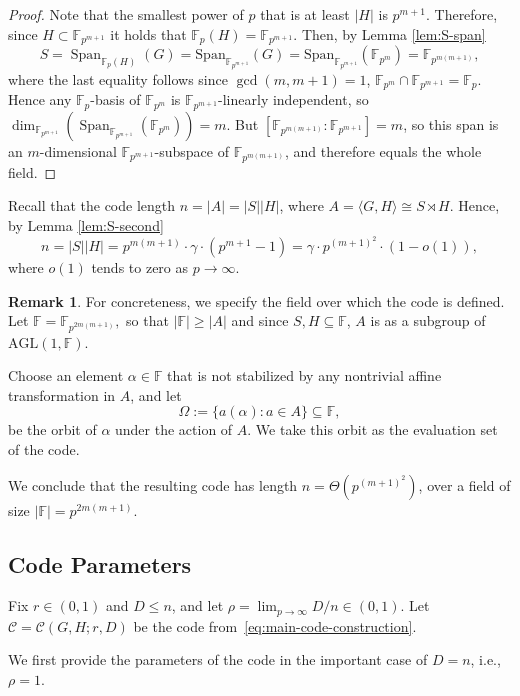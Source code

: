 \documentclass[11pt]{article}
\theoremstyle{plain}
\theoremstyle{definition}
\newtheorem{remark}[theorem]{Remark}
\newcommand{\abs}[1]{\left|#1\right|}
\DeclareMathOperator{\Span}{Span}
\begin{document}
\begin{proof}
Note that the smallest power of $p$ that is at least $\abs{H}$ is $p^{m+1}$. Therefore,  since $H\subset \mathbb{F}_{p^{m+1}}$ it holds that $\mathbb{F}_p(H)=\mathbb{F}_{p^{m+1}}.$
Then, by Lemma \ref{lem:S-span} 
\[
S=\Span_{\mathbb{F}_p(H)}(G)
=\mathrm{Span}_{\mathbb F_{p^{m+1}}}(G)=
\mathrm{Span}_{\mathbb F_{p^{m+1}}}(\mathbb{F}_{p^m})=\mathbb{F}_{p^{m(m+1)}},\]
where the last equality follows since $\gcd(m,m+1)=1$, $\mathbb{F}_{p^m}\cap \mathbb{F}_{p^{m+1}}=\mathbb{F}_p$.
Hence any $\mathbb{F}_p$-basis of $\mathbb{F}_{p^m}$ is $\mathbb{F}_{p^{m+1}}$-linearly independent, so
$\dim_{\mathbb{F}_{p^{m+1}}}\left(\Span_{\mathbb{F}_{p^{m+1}}}(\mathbb{F}_{p^m})\right)=m$.
But $[\mathbb{F}_{p^{m(m+1)}}:\mathbb{F}_{p^{m+1}}]=m$, so this span is an
$m$-dimensional $\mathbb{F}_{p^{m+1}}$-subspace of $\mathbb{F}_{p^{m(m+1)}}$, and therefore equals the whole field.
\end{proof}
Recall that the code length $n=|A|=|S||H|$, where 
$
A=\langle G,H\rangle \cong S\rtimes H.
$
Hence, by Lemma \ref{lem:S-second}
\[
n=|S||H| = p^{m(m+1)}\cdot \gamma\cdot (p^{m+1}-1)= \gamma\cdot p^{(m+1)^2}\cdot (1-o(1)),
\]
where $o(1)$ tends to zero as $p\to\infty$.
\begin{remark}
For concreteness, we specify the  field over which the code is defined. Let
$
\mathbb{F} = \mathbb{F}_{p^{2m(m+1)}},
$
so that $|\mathbb{F}| \ge |A|$ and since $S,H\subseteq \mathbb{F}$, $A$ is as a subgroup of $\mathrm{AGL}(1,\mathbb{F})$. 
\end{remark}
Choose an element $\alpha \in \mathbb{F}$ that is not stabilized by any nontrivial affine transformation in $A$,  and let
\[
\Omega := \{ a(\alpha) : a \in A \} \subseteq \mathbb{F},
\]
be the orbit of $\alpha$ under the  action of $A$. We take this orbit as the evaluation set of the code.

We conclude that  the resulting code has length
$
n  = \Theta\!\left(p^{(m+1)^2}\right)
$, 
over a field of size $|\mathbb{F}| = p^{2m(m+1)}$. 




\subsection{Code Parameters}
Fix $r\in(0,1)$ and $D\le n$, and let $\rho=\lim_{p\to\infty} D/n\in(0,1)$.
Let $\mathcal{C}=\mathcal{C}(G,H;r,D)$ be the code from~\eqref{eq:main-code-construction}.

We first provide the parameters of the code in the important case of $D=n$, i.e., $\rho=1$.
\end{document}
